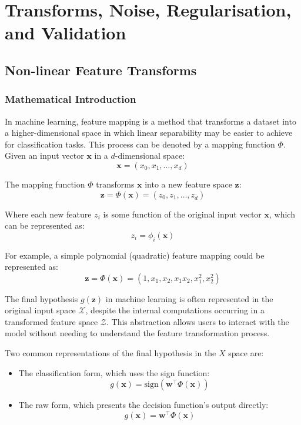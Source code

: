 \chapter{Transforms, Noise, Regularisation, and Validation}
\section{Non-linear Feature Transforms}

\subsection{Mathematical Introduction}
In machine learning, feature mapping is a method that transforms a dataset into a higher-dimensional space in which linear separability may be easier to achieve for classification tasks. This process can be denoted by a mapping function $\Phi$.\\

Given an input vector $\mathbf{x}$ in a $d$-dimensional space:
\begin{equation}
    \mathbf{x} = (x_0, x_1, \ldots, x_d)
\end{equation}

The mapping function $\Phi$ transforms $\mathbf{x}$ into a new feature space $\mathbf{z}$:
\begin{equation}
    \mathbf{z} = \Phi(\mathbf{x}) = (z_0, z_1, \ldots, z_{\bar{d}})
\end{equation}

Where each new feature $z_i$ is some function of the original input vector $\mathbf{x}$, which can be represented as:
\begin{equation}
    z_i = \phi_i(\mathbf{x})
\end{equation}

For example, a simple polynomial (quadratic) feature mapping could be represented as:
\begin{equation}
    \mathbf{z} = \Phi(\mathbf{x}) = (1, x_1, x_2, x_1x_2, x_1^2, x_2^2)
\end{equation}

The final hypothesis $g(\mathbf{z})$ in machine learning is often represented in the original input space \( \mathcal{X} \), despite the internal computations occurring in a transformed feature space \( \mathcal{Z} \). This abstraction allows users to interact with the model without needing to understand the feature transformation process.

Two common representations of the final hypothesis in the \( \mathcal{}{X} \) space are:
\begin{itemize}
    \item The classification form, which uses the sign function:
    \begin{equation}
        g(\mathbf{x}) = \text{sign}(\mathbf{w}^\top\Phi(\mathbf{x}))
    \end{equation}
    \item The raw form, which presents the decision function's output directly:
    \begin{equation}
        g(\mathbf{x}) = \mathbf{w}^\top\Phi(\mathbf{x})
    \end{equation}
\end{itemize}

